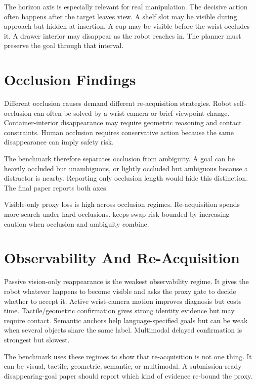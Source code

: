 The horizon axis is especially relevant for real manipulation. The decisive action often happens after the target leaves view. A shelf slot may be visible during approach but hidden at insertion. A cup may be visible before the wrist occludes it. A drawer interior may disappear as the robot reaches in. The planner must preserve the goal through that interval.

\section{Occlusion Findings}

Different occlusion causes demand different re-acquisition strategies. Robot self-occlusion can often be solved by a wrist camera or brief viewpoint change. Container-interior disappearance may require geometric reasoning and contact constraints. Human occlusion requires conservative action because the same disappearance can imply safety risk.

The benchmark therefore separates occlusion from ambiguity. A goal can be heavily occluded but unambiguous, or lightly occluded but ambiguous because a distractor is nearby. Reporting only occlusion length would hide this distinction. The final paper reports both axes.

Visible-only proxy loss is high across occlusion regimes. Re-acquisition spends more search under hard occlusions. \method keeps swap risk bounded by increasing caution when occlusion and ambiguity combine.

\section{Observability And Re-Acquisition}

Passive vision-only reappearance is the weakest observability regime. It gives the robot whatever happens to become visible and asks the proxy gate to decide whether to accept it. Active wrist-camera motion improves diagnosis but costs time. Tactile/geometric confirmation gives strong identity evidence but may require contact. Semantic anchors help language-specified goals but can be weak when several objects share the same label. Multimodal delayed confirmation is strongest but slowest.

The benchmark uses these regimes to show that re-acquisition is not one thing. It can be visual, tactile, geometric, semantic, or multimodal. A submission-ready disappearing-goal paper should report which kind of evidence re-bound the proxy.

